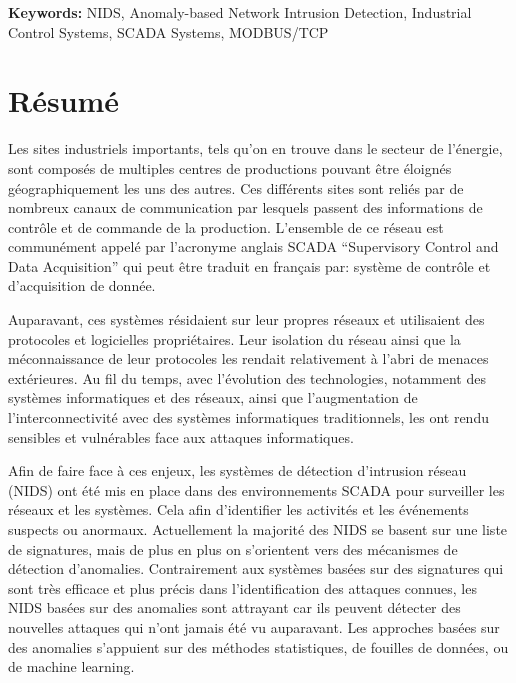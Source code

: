 \documentclass[11pt,]{article}
\begin{document}
\bigskip
\bigskip
\textbf{Keywords: } NIDS, Anomaly-based Network Intrusion Detection,
Industrial Control Systems, SCADA Systems, MODBUS/TCP

\newpage
\mbox{} \thispagestyle{empty}

\clearpage

\section*{Résumé}\label{resume}

Les sites industriels importants, tels qu'on en trouve dans le secteur
de l'énergie, sont composés de multiples centres de productions pouvant
être éloignés géographiquement les uns des autres. Ces différents sites
sont reliés par de nombreux canaux de communication par lesquels passent
des informations de contrôle et de commande de la production. L'ensemble
de ce réseau est communément appelé par l'acronyme anglais SCADA
``Supervisory Control and Data Acquisition'' qui peut être traduit en
français par: système de contrôle et d'acquisition de donnée.

Auparavant, ces systèmes résidaient sur leur propres réseaux et
utilisaient des protocoles et logicielles propriétaires. Leur isolation
du réseau ainsi que la méconnaissance de leur protocoles les rendait
relativement à l'abri de menaces extérieures. Au fil du temps, avec
l'évolution des technologies, notamment des systèmes informatiques et
des réseaux, ainsi que l'augmentation de l'interconnectivité avec des
systèmes informatiques traditionnels, les ont rendu sensibles et
vulnérables face aux attaques informatiques.

Afin de faire face à ces enjeux, les systèmes de détection d'intrusion
réseau (NIDS) ont été mis en place dans des environnements SCADA pour
surveiller les réseaux et les systèmes. Cela afin d'identifier les
activités et les événements suspects ou anormaux. Actuellement la
majorité des NIDS se basent sur une liste de signatures, mais de plus en
plus on s'orientent vers des mécanismes de détection d'anomalies.
Contrairement aux systèmes basées sur des signatures qui sont très
efficace et plus précis dans l'identification des attaques connues, les
NIDS basées sur des anomalies sont attrayant car ils peuvent détecter
des nouvelles attaques qui n'ont jamais été vu auparavant. Les approches
basées sur des anomalies s'appuient sur des méthodes statistiques, de
fouilles de données, ou de machine learning.
\end{document}

